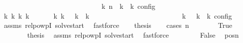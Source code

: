 \begin{isabellebody}
\ \ \ \ \ \ \ \ \ \ \ \ \ \ \ \ \ \ \ \ \ \ \ \ \ {\isasymand}\ {\isasymrho}\ {\isasymin}\ {\isasymlbrakk}\ {\isasymGamma}\isactrlsub k{\isacharcomma}\ n\ {\isasymturnstile}\ {\isasymPsi}\isactrlsub k\ {\isasymtriangleright}\ {\isasymPhi}\isactrlsub k\ {\isasymrbrakk}\isactrlsub c\isactrlsub o\isactrlsub n\isactrlsub f\isactrlsub i\isactrlsub g{\isacartoucheclose}\isanewline
%
\isadelimproof
%
\endisadelimproof
%
\isatagproof
{}\isamarkupfalse%
\ {\isacharminus}\isanewline
\ \ \isamarkupfalse%
\ {}{\isacharcolon}{\isacartoucheopen}{\isasymexists}{\isasymGamma}\isactrlsub k\ {\isasymPsi}\isactrlsub k\ {\isasymPhi}\isactrlsub k\ k{\isachardot}\ {\isacharparenleft}{\isacharparenleft}{\isacharbrackleft}{\isacharbrackright}{\isacharcomma}\ {}\ {\isasymturnstile}\ {\isasymPsi}\ {\isasymtriangleright}\ {\isacharbrackleft}{\isacharbrackright}{\isacharparenright}\ {\isasymhookrightarrow}\isactrlbsup k\isactrlesup \ {\isacharparenleft}{\isasymGamma}\isactrlsub k{\isacharcomma}\ {}\ {\isasymturnstile}\ {\isasymPsi}\isactrlsub k\ {\isasymtriangleright}\ {\isasymPhi}\isactrlsub k{\isacharparenright}{\isacharparenright}\isanewline
\ \ \ \ \ \ \ \ \ \ \ \ \ \ \ \ \ \ \ \ \ \ {\isasymand}\ {\isasymrho}\ {\isasymin}\ {\isasymlbrakk}\ {\isasymGamma}\isactrlsub k{\isacharcomma}\ {}\ {\isasymturnstile}\ {\isasymPsi}\isactrlsub k\ {\isasymtriangleright}\ {\isasymPhi}\isactrlsub k\ {\isasymrbrakk}\isactrlsub c\isactrlsub o\isactrlsub n\isactrlsub f\isactrlsub i\isactrlsub g{\isacartoucheclose}\isanewline
\ \ \ \ \isamarkupfalse%
\ assms\ relpowp{\isacharunderscore}{}{\isacharunderscore}I\ solve{\isacharunderscore}start\ \isamarkupfalse%
\ fastforce\isanewline
\ \ \isamarkupfalse%
\ {\isacharquery}thesis\isanewline
\ \ \isamarkupfalse%
\ {\isacharparenleft}cases\ {\isacartoucheopen}n\ {\isacharequal}\ {}{\isacartoucheclose}{\isacharparenright}\isanewline
\ \ \ \ \isamarkupfalse%
\ True\isanewline
\ \ \ \ \ \ \isamarkupfalse%
\ {\isacharquery}thesis\ \isamarkupfalse%
\ assms\ relpowp{\isacharunderscore}{}{\isacharunderscore}I\ solve{\isacharunderscore}start\ \isamarkupfalse%
\ fastforce\isanewline
\ \ \isamarkupfalse%
\isanewline
\ \ \ \ \isamarkupfalse%
\ False\ \isamarkupfalse%
\ pos{\isacharcolon}{\isacartoucheopen}n\ {\isachargreater}\ {}{\isacartoucheclose}\ \isamarkupfalse%

\end{isabellebody}
